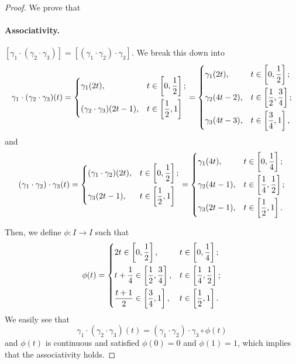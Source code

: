 \begin{proof}
	\par We prove that
	\paragraph{Associativity.} \([\gamma_{1}\cdot (\gamma_2\cdot \gamma_3)] = [(\gamma_1\cdot \gamma_2)\cdot \gamma_3]\). We break this down into
	\[
		\gamma_1\cdot(\gamma_2\cdot \gamma_3)(t) = \begin{dcases}
			\gamma_{1}(2t ),                 & t\in\left[0, \frac{1}{2}\right]; \\
			(\gamma_2\cdot \gamma_3)(2t-1) , & t\in\left[\frac{1}{2}, 1\right]
		\end{dcases} = \begin{dcases}
			\gamma_{1}(2t ), & t\in\left[0, \frac{1}{2}\right];           \\
			\gamma_2(4t-2) , & t\in\left[\frac{1}{2}, \frac{3}{4}\right]; \\
			\gamma_3(4t-3) , & t\in\left[\frac{3}{4}, 1\right],
		\end{dcases}
	\]
	and
	\[
		(\gamma_1\cdot\gamma_2)\cdot \gamma_3(t) = \begin{dcases}
			(\gamma_{1}\cdot \gamma_2) (2t ), & t\in\left[0, \frac{1}{2}\right]; \\
			\gamma_3(2t-1) ,                  & t\in\left[\frac{1}{2}, 1\right]
		\end{dcases} = \begin{dcases}
			\gamma_{1}(4t),  & t\in\left[0, \frac{1}{4}\right];           \\
			\gamma_2(4t-1) , & t\in\left[\frac{1}{4}, \frac{1}{2}\right]; \\
			\gamma_3(2t-1) , & t\in\left[\frac{1}{2}, 1\right].
		\end{dcases}
	\]

	\par Then, we define \(\phi \colon I\to I\) such that
	\[
		\phi (t) = \begin{dcases}
			2t\in\left[0, \frac{1}{2}\right],                      & t\in\left[0, \frac{1}{4}\right];           \\
			t+\frac{1}{4}\in\left[\frac{1}{2}, \frac{3}{4}\right], & t\in\left[\frac{1}{4}, \frac{1}{2}\right]; \\
			\frac{t+1}{2}\in\left[\frac{3}{4}, 1\right],           & t\in\left[\frac{1}{2}, 1\right].
		\end{dcases}
	\]
	We easily see that
	\[
		\gamma_1\cdot(\gamma_2\cdot \gamma_3)(t) = (\gamma_1\cdot\gamma_2)\cdot \gamma_{3}\circ \phi (t)
	\]
	and \(\phi (t)\) is continuous and satisfied \(\phi (0) = 0\) and \(\phi (1) = 1\), which implies that the associativity holds.


\end{proof}
